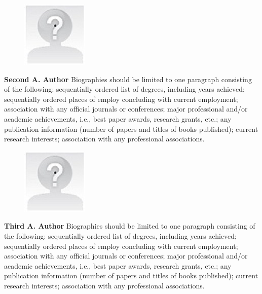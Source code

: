 \documentclass[10pt,a4paper,twocolumn]{article}
\newcommand{\ITUpar}{\vspace{8pt}\par}
\begin{document}
\begin{figure} 
    \vspace{-.1in}
    \includegraphics[width=0.39\columnwidth]{yourphotofilename.jpg} 
\end{figure}\textbf{Second A. Author} Biographies should be limited to one paragraph consisting of the following: sequentially ordered list of degrees, including years achieved; sequentially ordered places of employ concluding with current employment; association with any official journals or conferences; major professional and/or academic achievements, i.e., best paper awards, research grants, etc.; any publication information (number of papers and titles of books published); current research interests; association with any professional associations.\ITUpar

\begin{figure} 
    \vspace{-.1in}
    \includegraphics[width=0.39\columnwidth]{yourphotofilename.jpg} 
\end{figure}\textbf{Third A. Author} Biographies should be limited to one paragraph consisting of the following: sequentially ordered list of degrees, including years achieved; sequentially ordered places of employ concluding with current employment; association with any official journals or conferences; major professional and/or academic achievements, i.e., best paper awards, research grants, etc.; any publication information (number of papers and titles of books published); current research interests; association with any professional associations.\ITUpar
\end{document}
